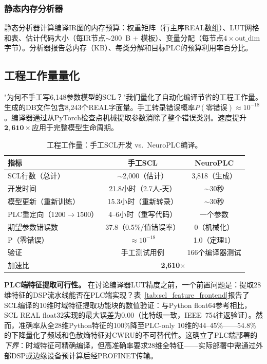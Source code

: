 \documentclass[journal,onecolumn]{IEEEtran}
\theoremstyle{definition}
\theoremstyle{plain}
\theoremstyle{remark}
\begin{document}
\subsubsection{静态内存分析器}

静态分析器计算编译IR图的内存预算：权重矩阵（行主序REAL数组）、LUT网格和表、估计代码大小（每IR节点$\sim$200~B + 模板）、变量分配（每节点$4 \times \text{out\_dim}$字节）。分析器报告总内存（KB）、每类分解和目标PLC的预算利用率百分比。

\subsection{工程工作量量化}
\label{sec:engineering}

"为何不手工写6,148参数模型的SCL？"我们量化了自动化编译节省的工程工作量。生成的DB文件包含8,243个REAL字面量。手工转录错误概率$P(\text{零错误}) \approx 10^{-18}$。编译器通过从PyTorch检查点机械提取参数消除了整个错误类别。速度提升$\mathbf{2{,}610\times}$应用于完整模型生命周期。

\begin{table}[!t]
\centering
\caption{工程工作量：手工SCL开发 vs.\ NeuroPLC编译。}
\label{tab:engineering}
\begin{tabular}{p{2.8cm}cc}
\toprule
\textbf{指标} & \textbf{手工SCL} & \textbf{NeuroPLC} \\
\midrule
SCL行数（总计） & $\sim$2,000（估计） & 3,818（生成） \\
开发时间 & 21.8小时（2.7人-天） & $\sim$30秒 \\
模型更新（重新训练） & 15.3小时（重新转录） & $\sim$30秒 \\
PLC重定向（1200$\rightarrow$1500） & 4--6小时（重写代码） & 一个参数 \\
期望参数错误数 & 37.8（0.5\%/值错误率） & 0（机械化） \\
P（零错误） & $\approx 10^{-18}$ & 1.0（定理1） \\
验证 & 手工测试用例 & 166个编译器测试 \\
\midrule
加速比 & \multicolumn{2}{c}{\textbf{2,610$\times$}} \\
\bottomrule
\end{tabular}
\end{table}


\vspace{4pt}
\noindent\textbf{PLC端特征提取可行性。}
在讨论编译器LUT精度之前，一个前置问题是：提取28维特征的DSP流水线能否在PLC端实现？表~\ref{tab:scl_feature_frontend}报告了SCL编译的10维时域特征提取功能块的数值验证：与Python float64参考相比，SCL REAL float32实现的最大误差为0.00（比特级一致，IEEE~754往返验证）。然而，准确率从全28维Python特征的100\%降至PLC-only 10维的44--45\%——54.8\%的下降量化了频域和色散熵特征对CWRU的不可替代性。这确立了PLC端部署的\textit{下界}：时域特征可精确编译，但高准确率要求28维全特征——实际部署中需通过外部DSP或边缘设备预计算后经PROFINET传输。
\end{document}
